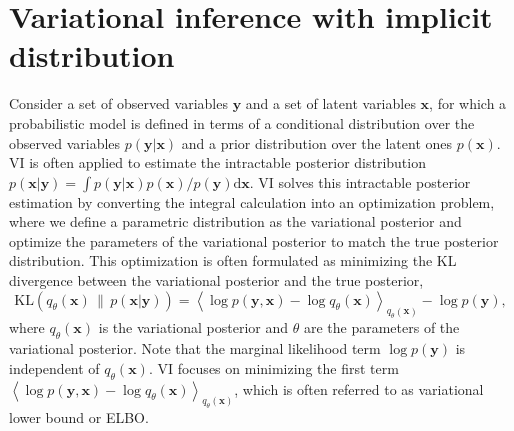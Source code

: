 \documentclass{article}
\newcommand{\yV}{\mathbf{y}}
\newcommand{\xV}{\mathbf{x}}
\newcommand{\bound}{\mathcal{L}}
\newcommand{\KL}[2]{\text{KL}\left( #1\,\|\,#2 \right)}
\newcommand{\expectationDist}[2]{\left\langle #1 \right\rangle _{#2}}
\newcommand{\diff}{\text{d}}
\begin{document}
\section{Variational inference with implicit distribution}

Consider a set of observed variables $\yV$ and a set of latent variables $\xV$, for which a probabilistic model is defined in terms of a conditional distribution over the observed variables $p(\yV|\xV)$ and a prior distribution over the latent ones $p(\xV)$. VI is often applied to estimate the intractable posterior distribution $p(\xV|\yV)=\int p(\yV|\xV)p(\xV)/p(\yV)\diff \xV$. VI solves this intractable posterior estimation by converting the integral calculation into an optimization problem, where we define a parametric distribution as the variational posterior and optimize the parameters of the variational posterior to match the true posterior distribution. This optimization is often formulated as minimizing the KL divergence between the variational posterior and the true posterior,
\begin{equation}
\KL{q_\theta(\xV)}{p(\xV|\yV)} = \expectationDist{\log p(\yV, \xV)-\log q_\theta(\xV)}{q_\theta(\xV)} - \log p(\yV),
\end{equation}
where $q_\theta(\xV)$ is the variational posterior and $\theta$ are the parameters of the variational posterior. Note that the marginal likelihood term $\log p(\yV)$ is independent of $q_\theta(\xV)$. VI focuses on minimizing the first term $\expectationDist{\log p(\yV, \xV)-\log q_\theta(\xV)}{q_\theta(\xV)}$, which is often referred to as variational lower bound or ELBO.

\end{document}
